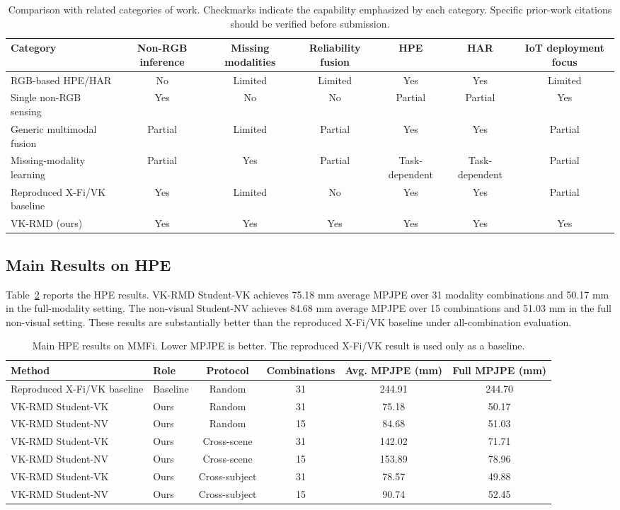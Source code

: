 \documentclass[journal]{IEEEtran}
\begin{document}
\begin{table}[!t]
\centering
\caption{Comparison with related categories of work. Checkmarks indicate the capability emphasized by each category. Specific prior-work citations should be verified before submission.}
\label{tab:related}
\begin{tabular}{lcccccc}
\toprule
Category & Non-RGB inference & Missing modalities & Reliability fusion & HPE & HAR & IoT deployment focus \\
\midrule
RGB-based HPE/HAR & No & Limited & Limited & Yes & Yes & Limited \\
Single non-RGB sensing & Yes & No & No & Partial & Partial & Yes \\
Generic multimodal fusion & Partial & Limited & Partial & Yes & Yes & Partial \\
Missing-modality learning & Partial & Yes & Partial & Task-dependent & Task-dependent & Partial \\
Reproduced X-Fi/VK baseline & Yes & Limited & No & Yes & Yes & Partial \\
VK-RMD (ours) & Yes & Yes & Yes & Yes & Yes & Yes \\
\bottomrule
\end{tabular}
\end{table}

\subsection{Main Results on HPE}

Table~\ref{tab:hpe} reports the HPE results. VK-RMD Student-VK achieves 75.18 mm average MPJPE over 31 modality combinations and 50.17 mm in the full-modality setting. The non-visual Student-NV achieves 84.68 mm average MPJPE over 15 combinations and 51.03 mm in the full non-visual setting. These results are substantially better than the reproduced X-Fi/VK baseline under all-combination evaluation.

\begin{table}[!t]
\centering
\caption{Main HPE results on MMFi. Lower MPJPE is better. The reproduced X-Fi/VK result is used only as a baseline.}
\label{tab:hpe}
\begin{tabular}{llcccc}
\toprule
Method & Role & Protocol & Combinations & Avg. MPJPE (mm) & Full MPJPE (mm) \\
\midrule
Reproduced X-Fi/VK baseline & Baseline & Random & 31 & 244.91 & 244.70 \\
VK-RMD Student-VK & Ours & Random & 31 & 75.18 & 50.17 \\
VK-RMD Student-NV & Ours & Random & 15 & 84.68 & 51.03 \\
VK-RMD Student-VK & Ours & Cross-scene & 31 & 142.02 & 71.71 \\
VK-RMD Student-NV & Ours & Cross-scene & 15 & 153.89 & 78.96 \\
VK-RMD Student-VK & Ours & Cross-subject & 31 & 78.57 & 49.88 \\
VK-RMD Student-NV & Ours & Cross-subject & 15 & 90.74 & 52.45 \\
\bottomrule
\end{tabular}
\end{table}
\end{document}
